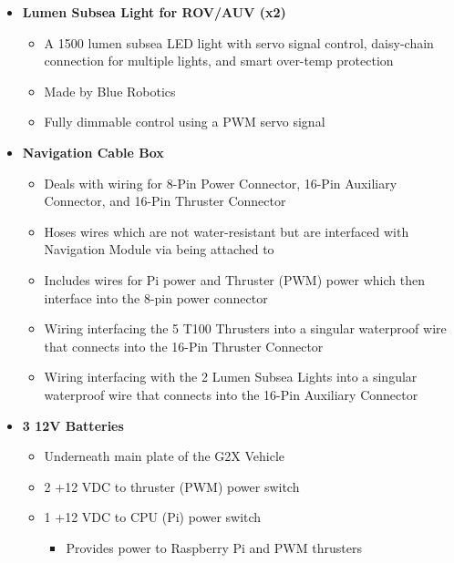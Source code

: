 \documentclass[12pt]{article}
\begin{document}
{\begin{itemize}
\begin{itemize}
\begin{itemize}
						\item Over 5 lbs of thrust
						\item Durable enough for great ocean depths
						\item Brushless electric motor (PWM servo signal)
					\end{itemize}
					\item[] \textbf{Lumen Subsea Light for ROV/AUV (x2)}
					\begin{itemize}
						\item A 1500 lumen subsea LED light with servo signal control, daisy-chain connection for multiple lights, and smart over-temp protection
						\item Made by Blue Robotics
						\item Fully dimmable control using a PWM servo signal
					\end{itemize}
					\item[] \textbf{Navigation Cable Box}
					\begin{itemize}
						\item Deals with wiring for 8-Pin Power Connector, 16-Pin Auxiliary Connector, and 16-Pin Thruster Connector
						\item Hoses wires which are not water-resistant but are interfaced with Navigation Module via being attached to 
						\item Includes wires for Pi power and Thruster (PWM) power which then interface into the 8-pin power connector
						\item Wiring interfacing the 5 T100 Thrusters into a singular waterproof wire that connects into the 16-Pin Thruster Connector
						\item Wiring interfacing with the 2 Lumen Subsea Lights into a singular waterproof wire that connects into the 16-Pin Auxiliary Connector
					\end{itemize}
					\item[] \textbf{3 12V Batteries}
					\begin{itemize}
						\item Underneath main plate of the G2X Vehicle
						\item 2 +12 VDC to thruster (PWM) power switch
						\item 1 +12 VDC to CPU (Pi) power switch
						\begin{itemize}
							\item Provides power to Raspberry Pi and PWM thrusters
						\end{itemize}
					\end{itemize}

\end{itemize}
\end{itemize}}
\end{document}
